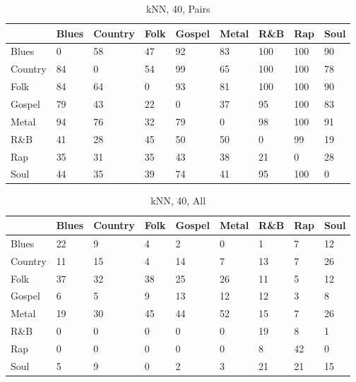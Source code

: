 \documentclass[a4paper,oneside]{article}
\begin{document}
\begin{table}[H]\centering
\caption{kNN, 40, Pairs}
\begin{tabu}{l|*{8}{l}}
 & Blues & Country & Folk & Gospel & Metal & R\&B & Rap & Soul \\ \hline
Blues & 0 & 58 & 47 & 92 & 83 & 100 & 100 & 90 \\
Country & 84 & 0 & 54 & 99 & 65 & 100 & 100 & 78 \\
Folk & 84 & 64 & 0 & 93 & 81 & 100 & 100 & 90 \\
Gospel & 79 & 43 & 22 & 0 & 37 & 95 & 100 & 83 \\
Metal & 94 & 76 & 32 & 79 & 0 & 98 & 100 & 91 \\
R\&B & 41 & 28 & 45 & 50 & 50 & 0 & 99 & 19 \\
Rap & 35 & 31 & 35 & 43 & 38 & 21 & 0 & 28 \\
Soul & 44 & 35 & 39 & 74 & 41 & 95 & 100 & 0 \\
\end{tabu}
\end{table}

\begin{table}[H]\centering
\caption{kNN, 40, All}
\begin{tabu}{l|*{8}{l}}
 & Blues & Country & Folk & Gospel & Metal & R\&B & Rap & Soul \\ \hline
Blues & 22 & 9 & 4 & 2 & 0 & 1 & 7 & 12 \\
Country & 11 & 15 & 4 & 14 & 7 & 13 & 7 & 26 \\
Folk & 37 & 32 & 38 & 25 & 26 & 11 & 5 & 12 \\
Gospel & 6 & 5 & 9 & 13 & 12 & 12 & 3 & 8 \\
Metal & 19 & 30 & 45 & 44 & 52 & 15 & 7 & 26 \\
R\&B & 0 & 0 & 0 & 0 & 0 & 19 & 8 & 1 \\
Rap & 0 & 0 & 0 & 0 & 0 & 8 & 42 & 0 \\
Soul & 5 & 9 & 0 & 2 & 3 & 21 & 21 & 15 \\
\end{tabu}
\end{table}
\end{document}
